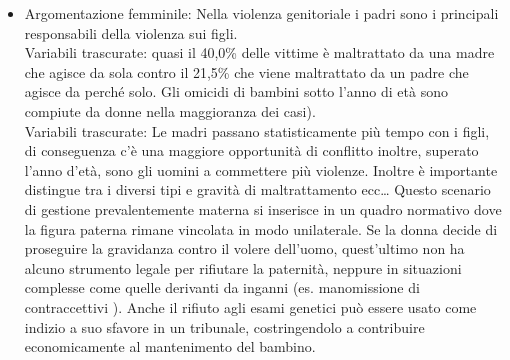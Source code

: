 \documentclass[12pt]{book} %
\begin{document}
\begin{mdframed}[linewidth=1pt]
\begin{itemize}
\\Variabili trascurate: conseguenze mediche. La violenza femminile, ha generalmente conseguenze meno gravi in termini di danni fisici, ricoveri o morti. 
\\Variabili trascurate: Uomini e donne, per motivi diversi, potrebbero non denunciare le aggressioni per vergogna sociale.
\item Argomentazione femminile: Nella violenza genitoriale i padri sono i principali responsabili della violenza sui figli.
\\Variabili trascurate: quasi il 40,0\% delle vittime è maltrattato da una madre che agisce da sola contro il 21,5\% che viene maltrattato da un padre che agisce da perché solo. Gli omicidi di bambini sotto l'anno di età sono compiute da donne nella maggioranza dei casi).
\\Variabili trascurate: Le madri passano statisticamente più tempo con i figli, di conseguenza c'è una maggiore opportunità di conflitto inoltre, superato l'anno d'età, sono gli uomini a commettere più violenze. Inoltre è importante distingue tra i diversi tipi e gravità di maltrattamento ecc… 
Questo scenario di gestione prevalentemente materna si inserisce in un quadro normativo dove la figura paterna rimane vincolata in modo unilaterale.
Se la donna decide di proseguire la gravidanza contro il volere dell’uomo, quest’ultimo non ha alcuno strumento legale per rifiutare la paternità, neppure in situazioni complesse come quelle derivanti da inganni (es. manomissione di contraccettivi ). Anche il rifiuto agli esami genetici può essere usato come indizio a suo sfavore in un tribunale, costringendolo a contribuire economicamente al mantenimento del bambino.

\end{itemize}
\end{mdframed}
\end{document}
